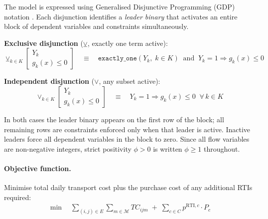 \begin{convention}
\label{conv:gdp}
The model is expressed using Generalised Disjunctive Programming
(GDP) notation \citep{Raman1994,Grossmann2012}. Each disjunction
identifies a \emph{leader binary} that activates an entire block
of dependent variables and constraints simultaneously.

\medskip
\noindent\textbf{Exclusive disjunction} ($\veebar$, exactly one
term active):
\begin{equation*}
  \veebar_{k\in K}
  \begin{bmatrix}
    Y_k \\ g_k(x) \leq 0
  \end{bmatrix}
  \quad\equiv\quad
  \texttt{exactly\_one}(Y_k,\;k\in K)
  \;\;\text{and}\;\;
  Y_k=1\Rightarrow g_k(x)\leq 0
\end{equation*}

\noindent\textbf{Independent disjunction} ($\vee$, any subset
active):
\begin{equation*}
  \vee_{k\in K}
  \begin{bmatrix}
    Y_k \\ g_k(x) \leq 0
  \end{bmatrix}
  \quad\equiv\quad
  Y_k=1\Rightarrow g_k(x)\leq 0
  \;\;\forall\,k\in K
\end{equation*}

\noindent In both cases the leader binary appears on the first row
of the block; all remaining rows are constraints enforced only
when that leader is active. Inactive leaders force all dependent
variables in the block to zero. Since all flow variables are
non-negative integers, strict positivity $\phi>0$ is written
$\phi\geq 1$ throughout.
\end{convention}


\paragraph{Objective function.}
Minimise total daily transport cost plus the purchase cost of any
additional RTIs required:
%
\begin{align}
  \min \quad
  \sum_{(i,j)\in E}\sum_{m\in\mathcal{M}} TC_{ijm}
  \;+\;
  \sum_{c\in C} p^{\text{RTI},c} \cdot P_{c}
  \label{eq:objective}
\end{align}

